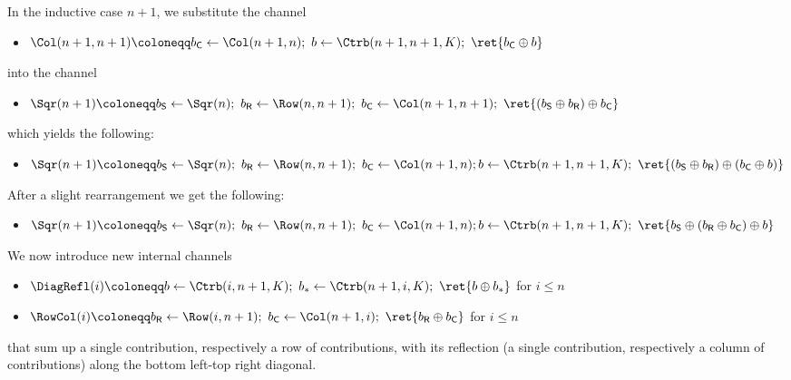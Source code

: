 \begin{itemize}
In the inductive case $n+1$, we substitute the channel
\begin{itemize}
\item $\Col(n+1,n+1) \coloneqq b_\mathsf{C} \leftarrow \Col(n+1,n); \ b \leftarrow \Ctrb(n+1,n+1,K); \ \ret{b_\mathsf{C} \oplus b}$
\end{itemize}
into the channel
\begin{itemize}
\item $\Sqr(n+1) \coloneqq b_\mathsf{S} \leftarrow \Sqr(n); \ b_\mathsf{R} \leftarrow \Row(n,n+1); \ b_\mathsf{C} \leftarrow \Col(n+1,n+1); \ \ret{(b_\mathsf{S} \oplus b_\mathsf{R}) \oplus b_\mathsf{C}}$
\end{itemize}
which yields the following:
\begin{itemize}
\item $\Sqr(n+1) \coloneqq b_\mathsf{S} \leftarrow \Sqr(n); \ b_\mathsf{R} \leftarrow \Row(n,n+1); \ b_\mathsf{C} \leftarrow \Col(n+1,n); \\ b \leftarrow \Ctrb(n+1,n+1,K); \ \ret{(b_\mathsf{S} \oplus b_\mathsf{R}) \oplus(b_\mathsf{C} \oplus b)}$
\end{itemize}
After a slight rearrangement we get the following:
\begin{itemize}
\item $\Sqr(n+1) \coloneqq b_\mathsf{S} \leftarrow \Sqr(n); \ b_\mathsf{R} \leftarrow \Row(n,n+1); \ b_\mathsf{C} \leftarrow \Col(n+1,n); \\ b \leftarrow \Ctrb(n+1,n+1,K); \ \ret{b_\mathsf{S} \oplus (b_\mathsf{R} \oplus b_\mathsf{C}) \oplus b}$
\end{itemize}
We now introduce new internal channels 
\begin{itemize}
\item $\DiagRefl(i) \coloneqq b \leftarrow \Ctrb(i,n+1,K); \ b_* \leftarrow \Ctrb(n+1,i,K); \ \ret{b \oplus b_*}$ for $i \leq n$
\item $\RowCol(i) \coloneqq b_\mathsf{R} \leftarrow \Row(i,n+1); \ b_\mathsf{C} \leftarrow \Col(n+1,i); \ \ret{b_\mathsf{R} \oplus b_\mathsf{C}}$ for $i \leq n$
\end{itemize}
that sum up a single contribution,  respectively a row of contributions, with its reflection (a single contribution, respectively a column of contributions) along the bottom left-top right diagonal.


\end{itemize}
